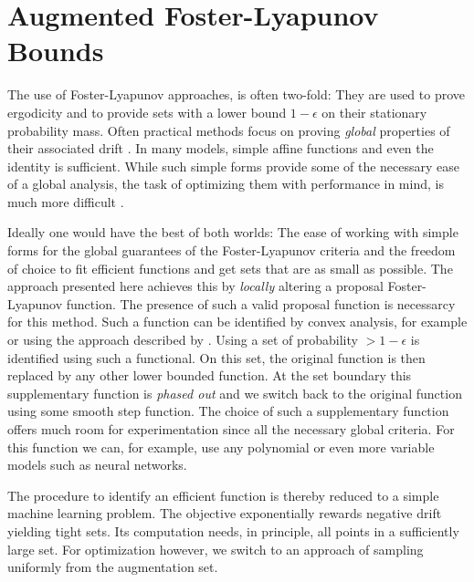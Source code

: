 \section{Augmented Foster-Lyapunov Bounds}\label{ch:lyapunov}
The use of Foster-Lyapunov approaches, is often two-fold: They are used to prove ergodicity and to provide sets with a lower bound $1-\epsilon$ on their stationary probability mass.
Often practical methods focus on proving \emph{global} properties of their associated drift \parencite{gupta2014scalable,spieler2014numerical}.
In many models, simple affine functions \parencite{gupta2017finite} and even the identity \parencite{spieler2014numerical} is sufficient.
While such simple forms provide some of the necessary ease of a global analysis, the task of optimizing them with performance in mind, is much more difficult \parencite{milias2014optimization}.

Ideally one would have the best of both worlds: The ease of working with simple forms for the global guarantees of the Foster-Lyapunov criteria and the freedom of choice to fit efficient functions and get sets that are as small as possible.
The approach presented here achieves this by \emph{locally} altering a proposal Foster-Lyapunov function.
The presence of such a valid proposal function is necessarcy for this method.
Such a function can be identified by convex analysis, for example \parencite{gupta2014scalable} or using the approach described by \textcite{spieler2014numerical}.
Using a set of probability $>1-\epsilon$ is identified using such a functional.
On this set, the original function is then replaced by any other lower bounded function.
At the set boundary this supplementary function is \emph{phased out} and we switch back to the original function using some smooth step function.
The choice of such a supplementary function offers much room for experimentation since all the necessary global criteria.
For this function we can, for example, use any polynomial or even more variable models such as neural networks.

The procedure to identify an efficient function is thereby reduced to a simple machine learning problem.
The objective exponentially rewards negative drift yielding tight sets.
Its computation needs, in principle, all points in a sufficiently large set.
For optimization however, we switch to an approach of sampling uniformly from the augmentation set.


